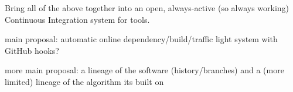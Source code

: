 \documentclass[conference]{IEEEtran}
\begin{document}
Bring all of the above together into an open, always-active (so always
working) Continuous Integration system for tools. 

main proposal: automatic online dependency/build/traffic light system
with GitHub hooks?

more main proposal: a lineage of the software (history/branches) and a
(more limited) lineage of the algorithm its built on





\end{document}
